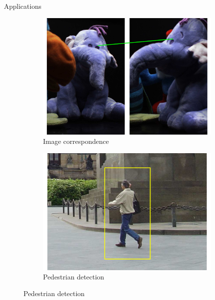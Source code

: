 \documentclass[14pt,t]{beamer}
\begin{document}
%
\begin{frame}[c]{Applications}
\begin{figure}
\centering
	\begin{subfigure}[t]{0.49\textwidth}
		\includegraphics[width=\textwidth]{../report/img/introductionIC.pdf}
		\caption{Image correspondence}
	\end{subfigure}
	\begin{subfigure}[t]{0.49\textwidth}
		\includegraphics[width=\textwidth]{../report/img/introductionOD.pdf}
		\caption{Pedestrian detection}
	\end{subfigure}
\end{figure}
\end{frame}
%
\end{document}
